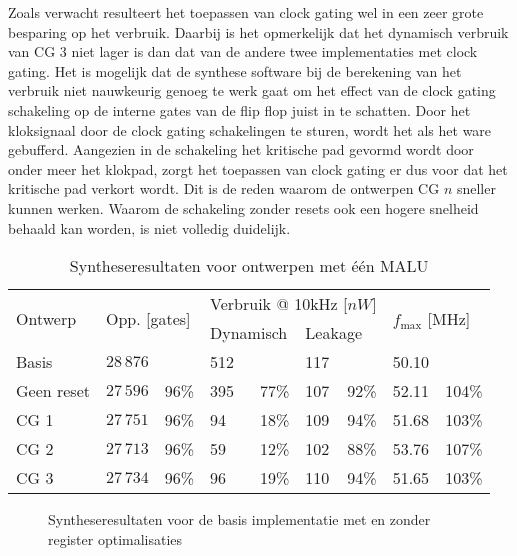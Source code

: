 Zoals verwacht resulteert het toepassen van clock gating wel in een zeer grote besparing op het verbruik. Daarbij is het opmerkelijk dat het dynamisch verbruik van CG 3 niet lager is dan dat van de andere twee implementaties met clock gating. Het is mogelijk dat de synthese software bij de berekening van het verbruik niet nauwkeurig genoeg te werk gaat om het effect van de clock gating schakeling op de interne gates van de flip flop juist in te schatten. Door het kloksignaal door de clock gating schakelingen te sturen, wordt het als het ware gebufferd. Aangezien in de schakeling het kritische pad gevormd wordt door onder meer het klokpad, zorgt het toepassen van clock gating er dus voor dat het kritische pad verkort wordt.  Dit is de reden waarom de ontwerpen CG $n$ sneller kunnen werken. Waarom de schakeling zonder resets ook een hogere snelheid behaald kan worden, is niet volledig duidelijk.

\begin{table}[h]
	\caption{Syntheseresultaten voor ontwerpen met \'e\'en MALU}
	\label{tabel-resultaten-optimalisaties}

	\centering
	\begin{tabular}{ll@{$\;\;$}rl@{$\;\;$}rl@{$\;\;$}rl@{$\;\;$}r}
		\toprule
		\multirow{2}{*}{Ontwerp}	& \multicolumn{2}{l}{\multirow{2}{*}{Opp. [gates]}}	& \multicolumn{4}{c}{Verbruik @ 10kHz [$nW$]}	& \multicolumn{2}{l}{\multirow{2}{*}{$f_{\text{max}}$ [MHz]}}\\
		\cmidrule{4-7}
		&	& & \multicolumn{2}{l}{Dynamisch}	& \multicolumn{2}{l}{Leakage}	& &\\
		\midrule
		Basis			& $28\,876$	& 			& 512	&	 		& 117 & 			& 50.10 	& \\
		Geen reset	& $27\,596$	& 96\%	& 395	& 77\%	& 107 & 92\%	& 52.11	& 104\%\\
		CG 1			& $27\,751$	& 96\%	& 94	& 18\%	& 109	& 94\%	& 51.68	& 103\%\\
		CG 2			& $27\,713$	& 96\%	& 59	& 12\%	& 102	& 88\%	& 53.76	& 107\%\\
		CG 3			& $27\,734$	& 96\%	& 96	& 19\%	& 110	& 94\%	& 51.65	& 103\%\\
		\bottomrule		
	\end{tabular}
\end{table}

\begin{figure}[h]
	\centering
		\caption{Syntheseresultaten voor de basis implementatie met en zonder register optimalisaties\label{figuur-resultaten-m1}}
\end{figure}

